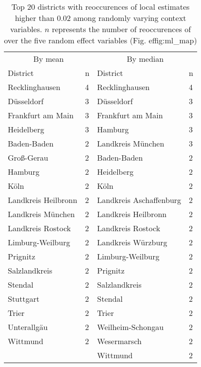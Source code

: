 \begin{table}

\caption[Top 20 districts with reoccurences of strong local estimates]{\label{tab:reoccurences}Top 20 districts with reoccurences of local estimates higher than 0.02 among randomly varying context variables. $n$ represents the number of reoccurences of over the five random effect variables (Fig. 
ef{fig:ml_map})}
\centering
\begin{tabular}[t]{llll}
\toprule
\multicolumn{2}{c}{By mean} & \multicolumn{2}{c}{By median} \\
\cmidrule(l{3pt}r{3pt}){1-2} \cmidrule(l{3pt}r{3pt}){3-4}
District & n & District & n\\
\midrule
Recklinghausen & 4 & Recklinghausen & 4\\
Düsseldorf & 3 & Düsseldorf & 3\\
Frankfurt am Main & 3 & Frankfurt am Main & 3\\
Heidelberg & 3 & Hamburg & 3\\
Baden-Baden & 2 & Landkreis München & 3\\
\addlinespace
Groß-Gerau & 2 & Baden-Baden & 2\\
Hamburg & 2 & Heidelberg & 2\\
Köln & 2 & Köln & 2\\
Landkreis Heilbronn & 2 & Landkreis Aschaffenburg & 2\\
Landkreis München & 2 & Landkreis Heilbronn & 2\\
\addlinespace
Landkreis Rostock & 2 & Landkreis Rostock & 2\\
Limburg-Weilburg & 2 & Landkreis Würzburg & 2\\
Prignitz & 2 & Limburg-Weilburg & 2\\
Salzlandkreis & 2 & Prignitz & 2\\
Stendal & 2 & Salzlandkreis & 2\\
\addlinespace
Stuttgart & 2 & Stendal & 2\\
Trier & 2 & Trier & 2\\
Unterallgäu & 2 & Weilheim-Schongau & 2\\
Wittmund & 2 & Wesermarsch & 2\\
 &  & Wittmund & 2\\
\bottomrule
\end{tabular}
\end{table}